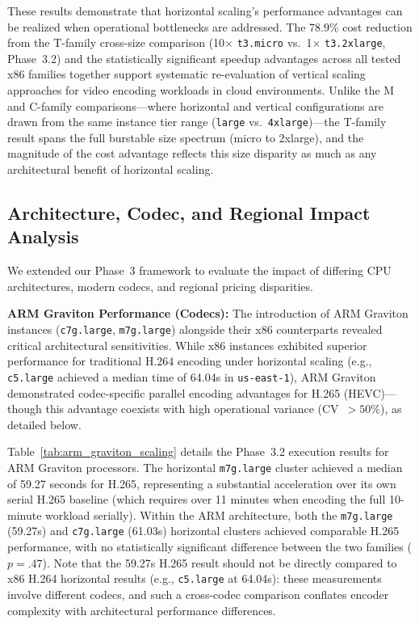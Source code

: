 \documentclass[conference]{IEEEtran}
\begin{document}
These results demonstrate that horizontal scaling's performance advantages can
be realized when operational bottlenecks are addressed. The 78.9\% cost
reduction from the T-family cross-size comparison (10$\times$ \texttt{t3.micro}
vs.\ 1$\times$ \texttt{t3.2xlarge}, Phase~3.2) and the statistically
significant speedup advantages across all tested x86 families together support
systematic re-evaluation of vertical scaling approaches for video encoding
workloads in cloud environments. Unlike the M and C-family comparisons---where
horizontal and vertical configurations are drawn from the same instance tier
range (\texttt{large} vs.\ \texttt{4xlarge})---the T-family result spans the
full burstable size spectrum (micro to 2xlarge), and the magnitude of the cost
advantage reflects this size disparity as much as any architectural benefit of
horizontal scaling.

\subsection{Architecture, Codec, and Regional Impact Analysis}

We extended our Phase~3 framework to evaluate the impact of differing CPU architectures, modern codecs, and regional pricing disparities.

\textbf{ARM Graviton Performance (Codecs):} The introduction of ARM Graviton instances (\texttt{c7g.large}, \texttt{m7g.large}) alongside their x86 counterparts revealed critical architectural sensitivities. While x86 instances exhibited superior performance for traditional H.264 encoding under horizontal scaling (e.g., \texttt{c5.large} achieved a median time of 64.04s in \texttt{us-east-1}), ARM Graviton demonstrated codec-specific parallel encoding advantages for H.265 (HEVC)---though this advantage coexists with high operational variance (CV~$>50\%$), as detailed below.

Table~\ref{tab:arm_graviton_scaling} details the Phase~3.2 execution results for ARM Graviton processors. The horizontal \texttt{m7g.large} cluster achieved a median of 59.27 seconds for H.265, representing a substantial acceleration over its own serial H.265 baseline (which requires over 11 minutes when encoding the full 10-minute workload serially). Within the ARM architecture, both the \texttt{m7g.large} (59.27s) and \texttt{c7g.large} (61.03s) horizontal clusters achieved comparable H.265 performance, with no statistically significant difference between the two families ($p = .47$). Note that the 59.27s H.265 result should not be directly compared to x86 H.264 horizontal results (e.g., \texttt{c5.large} at 64.04s): these measurements involve different codecs, and such a cross-codec comparison conflates encoder complexity with architectural performance differences.
\end{document}
